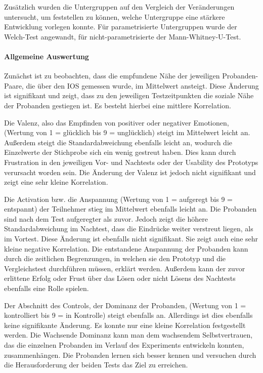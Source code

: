 Zusätzlich wurden die Untergruppen auf den Vergleich der Veränderungen untersucht, um feststellen zu können, welche Untergruppe eine stärkere Entwicklung vorlegen konnte. Für parametrisierte Untergruppen wurde der Welch-Test angewandt, für nicht-parametrisierte der Mann-Whitney-U-Test.

\paragraph{Allgemeine Auswertung}

Zunächst ist zu beobachten, dass die empfundene Nähe der jeweiligen Probanden-Paare, die über den \ac{IOS} gemessen wurde, im Mittelwert ansteigt. Diese Änderung ist signifikant und zeigt, dass zu den jeweiligen Testzeitpunkten die soziale Nähe der Probanden gestiegen ist. Es besteht hierbei eine mittlere Korrelation.

Die Valenz, also das Empfinden von positiver oder negativer Emotionen, (Wertung von 1 = glücklich bis 9 = unglücklich) steigt im Mittelwert leicht an. Außerdem steigt die Standardabweichung ebenfalls leicht an, wodurch die Einzelwerte der Stichprobe sich ein wenig gestreut haben. Dies kann durch Frustration in den jeweiligen Vor- und Nachtests oder der Usability des Prototyps verursacht worden sein. Die Änderung der Valenz ist jedoch nicht signifikant und zeigt eine sehr kleine Korrelation. 

Die Activation bzw. die Anspannung (Wertung von 1 = aufgeregt bis 9 = entspannt) der Teilnehmer stieg im Mittelwert ebenfalls leicht an. Die Probanden sind nach dem Test aufgeregter als zuvor. Jedoch zeigt die höhere Standardabweichung im Nachtest, dass die Eindrücke weiter verstreut liegen, als im Vortest.  Diese Änderung ist ebenfalls nicht signifikant. Sie zeigt auch eine sehr kleine negative Korrelation. Die entstandene Anspannung der Probanden kann durch die zeitlichen Begrenzungen, in welchen sie den Prototyp und die Vergleichstest durchführen müssen, erklärt werden. Außerdem kann der zuvor erlittene Erfolg oder Frust über das Lösen oder nicht Lösens des Nachtests ebenfalls eine Rolle spielen. 

Der Abschnitt des Controls, der Dominanz der Probanden, (Wertung von 1 = kontrolliert bis 9 = in Kontrolle) steigt ebenfalls an. Allerdings ist dies ebenfalls keine signifikante Änderung. Es konnte nur eine kleine Korrelation festgestellt werden. Die Wachsende Dominanz kann man dem wachsendem Selbstvertrauen, das die einzelnen Probanden im Verlauf des Experiments entwickeln konnten, zusammenhängen. Die Probanden lernen sich besser kennen und versuchen durch die Herausforderung der beiden Tests das Ziel zu erreichen.



